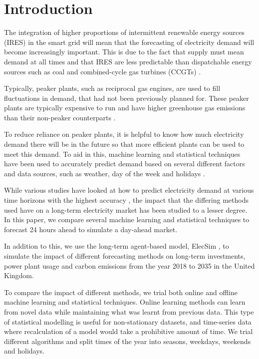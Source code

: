 \documentclass[final,3p,times,twocolumn,numbers]{elsarticle}
\begin{document}

\section{Introduction}
\label{sec:intro}

The integration of higher proportions of intermittent renewable energy sources (IRES) in the smart grid will mean that the forecasting of electricity demand will become increasingly important. This is due to the fact that supply must mean demand at all times and that IRES are less predictable than dispatchable energy sources such as coal and combined-cycle gas turbines (CCGTs) \cite{Lu1993}.

Typically, peaker plants, such as reciprocal gas engines, are used to fill fluctuations in demand, that had not been previously planned for. These peaker plants are typically expensive to run and have higher greenhouse gas emissions than their non-peaker counterparts \cite{Mahmood2014}. 

To reduce reliance on peaker plants, it is helpful to know how much electricity demand there will be in the future so that more efficient plants can be used to meet this demand. To aid in this, machine learning and statistical techniques have been used to accurately predict demand based on several different factors and data sources, such as weather, day of the week and holidays \cite{Kell2018a, Al-Musaylh2018, Vrablecova2017, Hong2014}. 



While various studies have looked at how to predict electricity demand at various time horizons with the highest accuracy \cite{Singh2012}, the impact that the differing methods used have on a long-term electricity market has been studied to a lesser degree. In this paper, we compare several machine learning and statistical techniques to forecast 24 hours ahead to simulate a day-ahead market. 

In addition to this, we use the long-term agent-based model, ElecSim \cite{Kell, Kell2020}, to simulate the impact of different forecasting methods on long-term investments, power plant usage and carbon emissions from the year 2018 to 2035 in the United Kingdom. 



To compare the impact of different methods, we trial both online and offline machine learning and statistical techniques. Online learning methods can learn from novel data while maintaining what was learnt from previous data. This type of statistical modelling is useful for non-stationary datasets, and time-series data where recalculation of a model would take a prohibitive amount of time. We trial different algorithms and split times of the year into seasons, weekdays, weekends and holidays.
\end{document}
